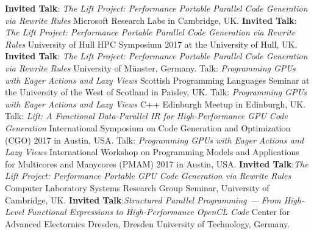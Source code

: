 \documentclass[11pt,a4paper]{moderncv}
\newcommand{\strong}[1]{\textcolor{color1}{\textbf{#1}}}
\begin{document}
         {\strong{Invited Talk}:\newline
          \emph{The Lift Project: Performance Portable Parallel Code Generation via Rewrite Rules}\newline
         \small Microsoft Research Labs in Cambridge, UK.}
         {\strong{Invited Talk}:\newline
          \emph{The Lift Project: Performance Portable Parallel Code Generation via Rewrite Rules}\newline
         \small University of Hull HPC Symposium 2017 at the University of Hull, UK.}
         {\strong{Invited Talk}:\newline
          \emph{The Lift Project: Performance Portable Parallel Code Generation via Rewrite Rules}\newline
         \small University of Münster, Germany.}
         {Talk: \emph{Programming GPUs with Eager Actions and Lazy Views}\newline
         \small Scottish Programming Languages Seminar at the University of the West of Scotland in Paisley, UK.}
         {Talk: \emph{Programming GPUs with Eager Actions and Lazy Views}\newline
         \small C++ Edinburgh Meetup in Edinburgh, UK.}
         {Talk: \emph{Lift: A Functional Data-Parallel IR for High-Performance GPU Code Generation}\newline
          \small International Symposium on Code Generation and Optimization (CGO) 2017 in Austin, USA.}
         {Talk: \emph{Programming GPUs with Eager Actions and Lazy Views}\newline
          \small  International Workshop on Programming Models and Applications for Multicores and Manycores (PMAM) 2017 in Austin, USA.}
         {\strong{Invited Talk}:\newline \emph{The Lift Project: Performance Portable GPU Code Generation via Rewrite Rules}\newline
         Computer Laboratory Systems Research Group Seminar, University of Cambridge, UK.
         }
         {\strong{Invited Talk}:\newline \emph{Structured Parallel Programming --- From High-Level Functional Expressions to High-Performance OpenCL Code}\newline
         Center for Advanced Electornics Dresden, Dresden University of Technology, Germany.
         }
\end{document}
